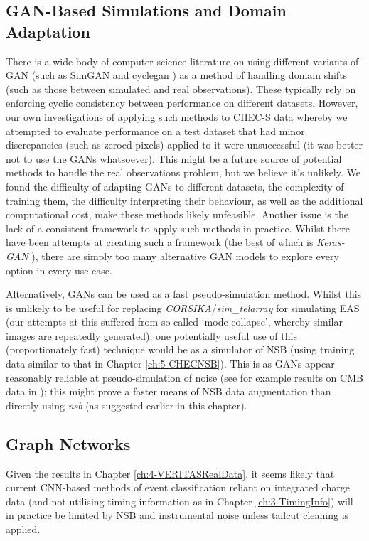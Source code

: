 \subsection{GAN-Based Simulations and Domain Adaptation}
There is a wide body of computer science literature on using different variants of GAN (such as SimGAN \cite{simgan} and cyclegan \cite{cyclegan}) as a method of handling domain shifts (such as those between simulated and real observations). These typically rely on enforcing cyclic consistency between performance on different datasets. However, our own investigations of applying such methods to CHEC-S data whereby we attempted to evaluate performance on a test dataset that had minor discrepancies (such as zeroed pixels) applied to it were unsuccessful (it was better not to use the GANs whatsoever). This might be a future source of potential methods to handle the real observations problem, but we believe it's unlikely. We found the difficulty of adapting GANs to different datasets, the complexity of training them, the difficulty interpreting their behaviour, as well as the additional computational cost, make these methods likely unfeasible. Another issue is the lack of a consistent framework to apply such methods in practice. Whilst there have been attempts at creating such a framework (the best of which is \textit{Keras-GAN} \cite{kerasgan}), there are simply too many alternative GAN models to explore every option in every use case. 

Alternatively, GANs can be used as a fast pseudo-simulation method. Whilst this is unlikely to be useful for replacing \textit{CORSIKA}/\textit{sim\_telarray} for simulating EAS (our attempts at this suffered from so called `mode-collapse', whereby similar images are repeatedly generated); one potentially useful use of this (proportionately fast) technique would be as a simulator of NSB (using training data similar to that in Chapter \ref{ch:5-CHECNSB}). This is as GANs appear reasonably reliable at pseudo-simulation of noise (see for example results on CMB data in \cite{darshgan}); this might prove a faster means of NSB data augmentation than directly using \textit{nsb} (as suggested earlier in this chapter). 

\subsection{Graph Networks}
Given the results in Chapter \ref{ch:4-VERITASRealData}, it seems likely that current CNN-based methods of event classification reliant on integrated charge data (and not utilising timing information as in Chapter \ref{ch:3-TimingInfo}) will in practice be limited by NSB and instrumental noise unless tailcut cleaning is applied.

